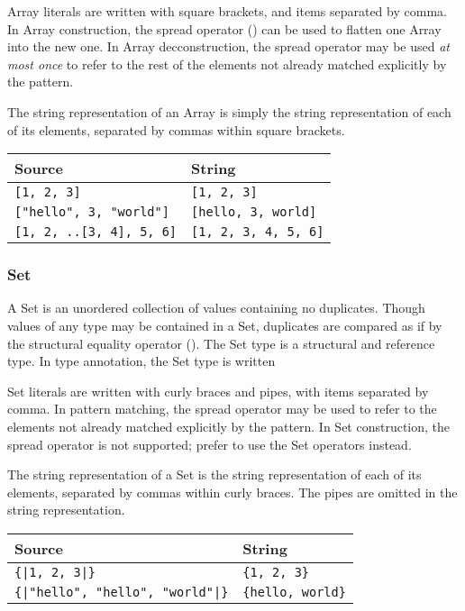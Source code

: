 Array literals are written with square brackets, and items separated by
comma. In Array construction, the spread operator () can be used
to flatten one Array into the new one. In Array decconstruction, the spread
operator may be used \emph{at most once} to refer to the rest of the elements
not already matched explicitly by the pattern.

The string representation of an Array is simply the string representation of
each of its elements, separated by commas within square brackets.

\begin{table}[H]
    \centering
    \begin{tabular}{ll}
        \hline
        \textbf{Source} & \textbf{String} \\
        \hline
        \texttt{[1, 2, 3]} & \texttt{[1, 2, 3]} \\
        \texttt{["hello", 3, "world"]} & \texttt{[hello, 3, world]} \\
        \texttt{[1, 2, ..[3, 4], 5, 6]} & \texttt{[1, 2, 3, 4, 5, 6]} \\
        \hline
    \end{tabular}
\end{table}

\subsubsection{Set}

A Set is an unordered collection of values containing no duplicates. Though
values of any type may be contained in a Set, duplicates are compared as if
by the structural equality operator (). The Set type is a structural
and reference type. In type annotation, the Set type is written 

Set literals are written with curly braces and pipes, with items separated by comma.
In pattern matching, the spread operator may be used to refer to the elements
not already matched explicitly by the pattern. In Set construction, the
spread operator is not supported; prefer to use the Set operators instead.

The string representation of a Set is the string representation of
each of its elements, separated by commas within curly braces. The pipes
are omitted in the string representation.

\begin{table}[H]
    \centering
    \begin{tabular}{ll}
        \hline
        \textbf{Source} & \textbf{String} \\
        \hline
        \texttt{\{|1, 2, 3|\}} & \texttt{\{1, 2, 3\}} \\
        \texttt{\{|"hello", "hello", "world"|\}} & \texttt{\{hello, world\}} \\
        \hline
    \end{tabular}
\end{table}

